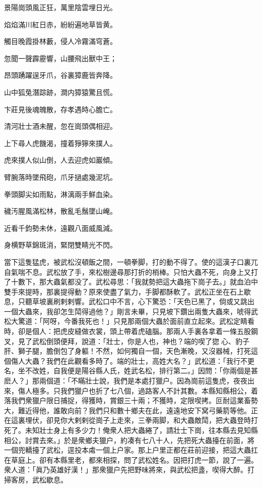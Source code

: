 \begin{myquote}
景陽崗頭風正狂，萬里陰雲埋日光。

焰焰滿川紅日赤，紛紛遍地草皆黄。

觸目晚霞掛林藪，侵人冷霧滿穹蒼。

忽聞一聲霹靂響，山腰飛出獸中王；

昂頭踴躍逞牙爪，谷裏獐鹿皆奔降。

山中狐兔潛踪跡，澗内獐猿驚且慌。

卞莊見後魂魄散，存孝遇時心膽亡。

清河壯士酒未醒，忽在崗頭偶相迎。

上下尋人虎饑渴，撞着猙獰來撲人。

虎來撲人似山倒，人去迎虎如巖傾。

臂腕落時墜飛砲，爪牙撾處幾泥坑。

拳頭脚尖如雨點，淋漓兩手鮮血染。

穢汚腥風滿松林，散亂毛鬚墜山崦。

近看千鈞勢未休，遠觀八面威風減。

身横野草錦斑消，緊閉雙睛光不閃。
\end{myquote}
	
當下這隻猛虎，被武松沒頓飯之間，一頓拳脚，打的動不得了。使的這漢子口裏兀自氣喘不息。武松放了手，來松樹邊尋那打折的梢棒。只怕大蟲不死，向身上又打了十數下，那大蟲氣都没了。武松尋思：「我就勢把這大蟲拖下崗子去。」就血泊中雙手來提時，那裏提得動？原來使盡了氣力，手脚都酥軟了。武松正坐在石上歇息，只聽草坡裏刷剌剌響。武松口中不言，心下驚恐：「天色已黑了，倘或又跳出一個大蟲來，我卻怎生鬦得過他？」剛言未畢，只見坡下鑽出兩隻大蟲來，唬得武松大驚道：「阿呀，今番我死也！」只見那兩個大蟲於面前直立起來。武松定睛看時，卻是個人：把虎皮縫做衣裳，頭上帶着虎磕腦。那兩人手裏各拿着一條五股鋼叉，見了武松倒頭便拜，說道：「壯士，你是人也，神也？端的喫了㺀𤝽心、豹子肝、獅子腿，膽倒包了身軀！不然，如何獨自一個，天色漸晚，又沒器械，打死這個傷人大蟲？我們在此觀看多時了。端的壯士，高姓大名？」武松道：「我行不更名，坐不改姓，自我便是陽谷縣人氏，姓武名松，排行第二。」因問：「你兩個是甚麽人？」那兩個道：「不瞞壯士說，我們是本處打獵户。因為崗前這隻虎，夜夜出來，傷人極多。只我們獵户也折了七八個，過路客人不計其數。本縣知縣相公，着落我們衆獵户限日捕捉，得獲時，賞銀三十兩；不獲時，定限喫拷。叵耐這業畜勢大，難近得他，誰敢向前？我們只和數十鄉夫在此，遠遠地安下窝弓藥箭等他。正在這裏埋伏，卻見你大剌剌從崗子上走來，三拳兩脚，和大蟲敵鬦，把大蟲登時打死了。未知壯士身上有多少力！俺衆人把大蟲綣了，請壯士下崗，往本縣去見知縣相公，討賞去來。」於是衆鄉夫獵户，約凑有七八十人，先把死大蟲擡在前面，將一個兜轎擡了武松，逕投本䖏一個上户家。那上户里正都在莊前迎接，把這大蟲扛在草庭上。卻有本縣里老，都來相探，問了武松姓名。因把打虎一節，說了一遍。衆人道：「眞乃英雄好漢！」那衆獵户先把野味將來，與武松把盞，喫得大醉。打掃客房，武松歇息。

